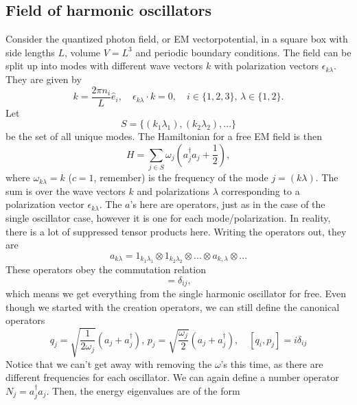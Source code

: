 \subsection{Field of harmonic oscillators}
Consider the quantized photon field, or EM vectorpotential, in a square box with side lengths $L$, volume $V = L^3$ and periodic boundary conditions. The field can be split up into modes with different wave vectors $k$ with polarization vectors $\epsilon_{k\lambda}$. They are given by
\begin{equation*}
    k = \frac{2 \pi n_i}{L}  \hat e_i, \quad \epsilon_{k\lambda} \cdot k = 0, \quad i \in \{1, 2, 3\}, \, \lambda \in \{1, 2\}.
\end{equation*}
Let 
\begin{equation*}
    S = \{(k_1\lambda_1), (k_2\lambda_2), ...\}
\end{equation*} 
be the set of all unique modes. The Hamiltonian for a free EM field is then        \begin{equation*}
    H = \sum_{j \in S} \omega_{j}\left( a^\dagger_{j}a_{j} + \frac{1}{2}\right),
\end{equation*}
where $\omega_{k\lambda} = k$ ($c=1$, remember) is the frequency of the mode $j = (k\lambda)$. The sum is over the wave vectors $k$ and polarizations $\lambda$ corresponding to a polarization vector $\epsilon_{k\lambda}$. The $a$'s here are operators, just as in the case of the single oscillator case, however it is one for each mode/polarization. In reality, there is a lot of suppressed tensor products here. Writing the operators out, they are
\begin{equation}
    a_{k\lambda} = 1_{k_1 \lambda_1}\otimes 1_{k_2 \lambda_2}\otimes ... \otimes a_{k, \lambda} \otimes ...
\end{equation}
These operators obey the commutation relation
\begin{equation*}
    [a_i, a^\dagger_j] = \delta_{ij},
\end{equation*}
which means we get everything from the single harmonic oscillator for free. Even though we started with the creation operators, we can still define the canonical operators
\begin{equation*}
    q_j = \sqrt{\frac{1}{2 \omega_j}}\left(a_j + a^\dagger_j\right), \, p_j = \sqrt{\frac{\omega_j}{2}}\left(a_j + a^\dagger_j\right), \quad [q_i, p_j] = i\delta_{ij}
\end{equation*}
Notice that we can't get away with removing the $\omega$'s this time, as there are different frequencies for each oscillator. We can again define a number operator $N_j =  a^\dagger_j a_j$. Then, the energy eigenvalues are of the form
